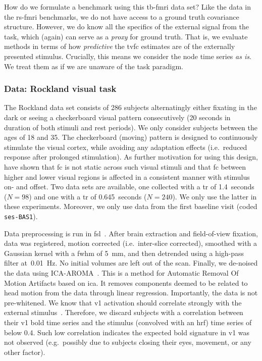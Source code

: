 How do we formulate a benchmark using this \gls{tb-fmri} data set?
Like the data in the \gls{rs-fmri} benchmarks, we do not have access to a ground truth covariance structure.
However, we do know all the specifics of the external signal from the task, which (again) can serve as a \emph{proxy} for ground truth.
That is, we evaluate methods in terms of how \emph{predictive} the \gls{tvfc} estimates are of the externally presented stimulus.
Crucially, this means we consider the node time series \emph{as is}.
We treat them as if we are unaware of the task paradigm.

\subsubsection{Data: Rockland visual task}\label{subsec:rockland-data}

The Rockland data set consists of 286 subjects alternatingly either fixating in the dark or seeing a checkerboard visual pattern consecutively (20 seconds in duration of both stimuli and rest periods).
We only consider subjects between the ages of 18 and 35.
The checkerboard (moving) pattern is designed to continuously stimulate the visual cortex, while avoiding any adaptation effects (i.e.~reduced response after prolonged stimulation).
As further motivation for using this design, \textcite{Di2015} have shown that \gls{fc} is not static across such visual stimuli and that \gls{fc} between higher and lower visual regions is affected in a consistent manner with stimulus on- and offset.
%
Two data sets are available, one collected with a \gls{tr} of 1.4~seconds ($N = 98$) and one with a \gls{tr} of 0.645~seconds ($N = 240$).
We only use the latter in these experiments.
Moreover, we only use data from the first baseline visit (coded \texttt{ses-BAS1}).

Data preprocessing is run in \gls{fsl}~\parencite{Jenkinson2012}.
After brain extraction and field-of-view fixation, data was registered, motion corrected (i.e.~inter-slice corrected), smoothed with a Gaussian kernel with a \gls{fwhm} of 5~mm, and then detrended using a high-pass filter at~0.01~Hz.
No initial volumes are left out of the scan.
Finally, we de-noised the data using ICA-AROMA~\parencite{Pruim2015a, Pruim2015b}.
This is a method for Automatic Removal Of Motion Artifacts based on \gls{ica}.
It removes components deemed to be related to head motion from the data through linear regression.
Importantly, the data is not pre-whitened.
%
We know that \gls{v1} activation should correlate strongly with the external stimulus~\parencite{Sahib2018}.
Therefore, we discard subjects with a correlation between their \gls{v1} \gls{bold} time series and the stimulus (convolved with an \gls{hrf}) time series of below 0.4.
Such low correlation indicates the expected \gls{bold} signature in \gls{v1} was not observed (e.g.~possibly due to subjects closing their eyes, movement, or any other factor).


